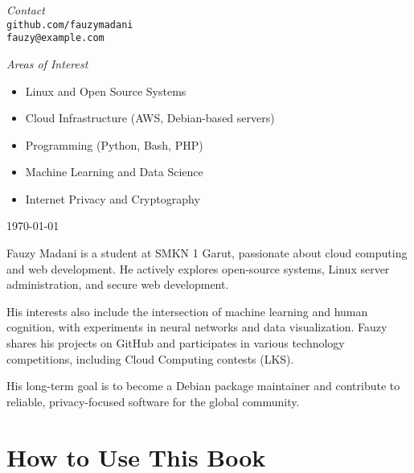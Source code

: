 \documentclass{book}
\begin{document}
\noindent
\begin{minipage}{0.48\textwidth}
  \large
  \textit{Contact}\\
  \texttt{github.com/fauzymadani} \\
  \texttt{fauzy@example.com}
\end{minipage}
\hfill
\begin{minipage}{0.48\textwidth}
  \large
  \textit{Areas of Interest}\\
  \begin{itemize}
    \setlength\itemsep{0.6em}
    \item Linux and Open Source Systems
    \item Cloud Infrastructure (AWS, Debian-based servers)
    \item Programming (Python, Bash, PHP)
    \item Machine Learning and Data Science
    \item Internet Privacy and Cryptography
  \end{itemize}
\end{minipage}

\vfill

\begin{center}
  {\large \today} %
\end{center}

\vspace{2em}

\noindent Fauzy Madani is a student at SMKN 1 Garut, passionate about cloud computing and web development. He actively explores open-source systems, Linux server administration, and secure web development.

His interests also include the intersection of machine learning and human cognition, with experiments in neural networks and data visualization. Fauzy shares his projects on GitHub and participates in various technology competitions, including Cloud Computing contests (LKS).

His long-term goal is to become a Debian package maintainer and contribute to reliable, privacy-focused software for the global community.

\clearpage

\tableofcontents
\clearpage

\chapter{How to Use This Book}
\tableofcontents
\clearpage
\end{document}
